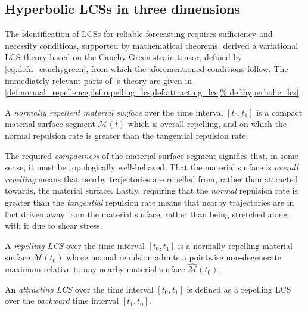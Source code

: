 \subsection{Hyperbolic LCSs in three dimensions}
\label{sub:hyperbolic_lcss_in_three_dimensions}

The identification of LCSs for reliable forecasting requires sufficiency and
necessity conditions, supported by mathematical theorems.
\textcite{haller2010variational} derived a variational LCS theory based on
the Cauchy-Green strain tensor, defined by \cref{eq:defn_cauchygreen}, from
which the aforementioned conditions follow. The immediately relevant parts
of \citeauthor{haller2010variational}'s theory are given in
\cref{def:normal_repellence,def:repelling_lcs,def:attracting_lcs,%
def:hyperbolic_lcs} \parencite{haller2010variational}.

\begin{defn}
    \label{def:normal_repellence}
    A \emph{normally repellent material surface} over the time interval
    $[t_{0},t_{1}]$ is a compact material surface segment $\mathcal{M}(t)$
    which is overall repelling, and on which the normal repulsion rate is
    greater than the tangential repulsion rate.
\end{defn}

The required \emph{compactness} of the material surface segment signifies that,
in some sense, it must be topologically well-behaved. That the material surface
is \emph{overall repelling} means that nearby trajectories are repelled from,
rather than attracted towards, the material surface. Lastly, requiring that the
\emph{normal} repulsion rate is greater than the \emph{tangential} repulsion
rate means that nearby trajectories are in fact driven away from the material
surface, rather than being stretched along with it due to shear stress.

\begin{defn}
    \label{def:repelling_lcs}
    A \emph{repelling LCS} over the time interval $[t_{0},t_{1}]$ is a
    normally repelling material surface $\mathcal{M}(t_{0})$ whose normal repulsion
    admits a pointwise non-degenerate maximum relative to any nearby material
    surface $\widehat{\mathcal{M}}(t_{0})$.
\end{defn}

\begin{defn}
    \label{def:attracting_lcs}
    An \emph{attracting LCS} over the time interval $[t_{0},t_{1}]$ is defined
    as a repelling LCS over the \emph{backward} time interval $[t_{1},t_{0}]$.
\end{defn}

